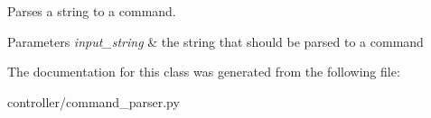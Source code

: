 Parses a string to a command. 


\begin{DoxyParams}{Parameters}
{\em input\+\_\+string} & the string that should be parsed to a command \\
\hline
\end{DoxyParams}


The documentation for this class was generated from the following file\+:\begin{DoxyCompactItemize}
\item 
controller/command\+\_\+parser.\+py\end{DoxyCompactItemize}
